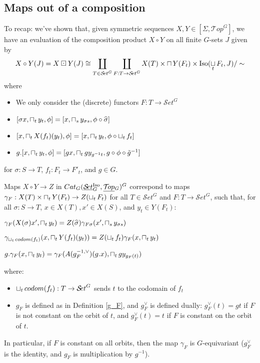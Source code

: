 \documentclass{report}
\newenvironment{renumerate}
{\begin{list}{\roman{enumi}.}
    {\itemsep=0in\usecounter{enumi}}
  }{\end{list}}
\newcommand{\Top}{\text{$\mathcal{T}\!op$}}
\newcommand{\Set}{\text{$\mathcal{S}\!et$}}
\DeclareMathOperator{\Iso}{Iso}
\newcommand{\TopG}{\text{\underline{$\Top$}$_G$}}
\newcommand{\SetG}{\text{\underline{$\Set$}$_G^{\mbox{\scriptsize Iso}}$}}
\newcommand{\icap}{\operatornamewithlimits{\sqcap}}
\newcommand{\ico}{\operatornamewithlimits{\sqcup}}
\renewcommand{\hat}[1]{\text{$\widehat{#1}$}}
\begin{document}
\subsection{Maps out of a composition}
To recap: we've shown that, given symmetric sequences $X,Y\in[\Sigma, \Top^G]$, we have an evaluation of the composition product $X\circ Y$ on all finite $G$-sets $J$ given by
\[X\circ Y(J) = X\boxdot Y(J) \cong \coprod_{T\in\Set^G}\coprod_{F:T\to\Set^G}X(T)\times \icap Y(F_t)\times \Iso(\ico_tF_t,J)/\sim\]
where
\begin{itemize}\itemsep-4pt
\item We only consider the (discrete) functors $F: T\to\Set^G$ %
\item $[\sigma x,\icap_ty_t,\phi] = [x,\icap_sy_{\sigma s},\phi\circ \hat \sigma]$
\item $[x,\icap_tX(f_t)(y_t),\phi] = [x,\icap_ty_t,\phi\circ \ico_tf_t]$
\item $g.[x,\icap_ty_t,\phi] = [gx,\icap_tgy_{g^{-1}t},g\circ\phi\circ\tilde g^{-1}]$
\end{itemize}
for $\sigma: S\to T$, $f_t: F_t\to F'_t$, and $g\in G$. 

\begin{prop}
  Maps $X\circ Y \to Z$ in $Cat_G(\SetG,\TopG)^G$ correspond to maps $\gamma_F: X(T)\times\icap_tY(F_t) \to Z(\ico_tF_t)$ for all $T\in\Set^G$ and $F: T\to \Set^G$, such that, for all $\sigma: S\to T$, $x\in X(T), x'\in X(S)$, and $y_t\in Y(F_t)$:
  \begin{renumerate}
  \item $\gamma_F(X(\sigma)x', \icap_ty_t) = Z(\hat\sigma)\gamma_{F\sigma}(x',\icap_sy_{\sigma s})$
  \item $\gamma_{\ico_t codom(f_t)}(x,\icap_tY(f_t)(y_t))=Z(\ico_tf_t)\gamma_F(x,\icap_ty_t)$ 
  \item $g.\gamma_F(x,\icap_ty_t) = \gamma_F(A(g^{-1, \vee}_F)(g.x),\icap_tgy_{g_F(t)})$
  \end{renumerate}
  where:
  \begin{itemize}\itemsep-4pt
  \item $\ico_t codom(f_t): T\to \Set^G$ sends $t$ to the codomain of $f_t$
  \item $g_F$ is defined as in Definition \ref{g_F}, and $g_F^\vee$ is defined dually: $g_F^\vee(t)=gt$ if $F$ is not constant on the orbit of $t$, and $g_F^\vee(t) = t$ if $F$ is constant on the orbit of $t$.
  \end{itemize}

In particular, if $F$ is constant on all orbits, then the map $\gamma_F$ is $G$-equivariant ($g_F^\vee$ is the identity, and $g_F$ is multiplication by $g^{-1}$).
\end{prop}
\end{document}
